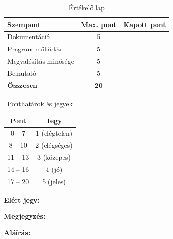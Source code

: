 \documentclass[12pt,a4paper]{article}
\begin{document}
\begin{table}[H]
  \centering
  \begin{tabular}{lcc}
    \toprule
    \textbf{Szempont}       & \textbf{Max. pont} & \textbf{Kapott pont} \\
    \midrule
    Dokumentáció            & 5                  &                      \\
    Program működés         & 5                  &                      \\
    Megvalósítás minősége   & 5                  &                      \\
    Bemutató                & 5                  &                      \\
    \midrule
    \textbf{Összesen}       & \textbf{20}        &                      \\
    \bottomrule
  \end{tabular}
  \caption{Értékelő lap}
\end{table}

\begin{table}[H]
  \centering
  \begin{tabular}{cc}
    \toprule
    \textbf{Pont} & \textbf{Jegy}    \\
    \midrule
    0 -- 7        & 1 (elégtelen)    \\
    8 -- 10       & 2 (elégséges)    \\
    11 -- 13      & 3 (közepes)      \\
    14 -- 16      & 4 (jó)           \\
    17 -- 20      & 5 (jeles)        \\
    \bottomrule
  \end{tabular}
  \caption{Ponthatárok és jegyek}
\end{table}

\bigskip
\noindent\textbf{Elért jegy:}\quad \underline{\hspace{3.5cm}}

\bigskip
\noindent\textbf{Megjegyzés:}\quad \underline{\hspace{9cm}}

\bigskip
\noindent\textbf{Aláírás:}\quad \underline{\hspace{5cm}}
\end{document}
